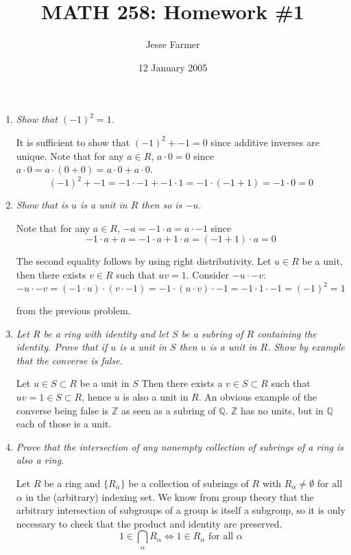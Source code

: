 \documentclass[letterpaper, 11pt]{article}
\title{MATH 258: Homework \#1}
\author{Jesse Farmer}
\date{12 January 2005}
\newcommand{\Z}{\mathbb{Z}}
\newcommand{\Q}{\mathbb{Q}}
\begin{document}
\maketitle
\begin{enumerate}

\item \emph{Show that $(-1)^2 = 1$.}

It is sufficient to show that $(-1)^2 + -1 = 0$ since additive inverses are unique.  Note that for any $a \in R$, $a \cdot 0 = 0$ since $a \cdot 0 = a \cdot (0+0) = a \cdot0 + a \cdot 0$.
\[
(-1)^2 + -1 = -1 \cdot -1 + -1 \cdot 1 = -1 \cdot (-1 + 1) = -1 \cdot 0 = 0
\]
\item \emph{Show that is $u$ is a unit in $R$ then so is $-u$.}

Note that for any $a \in R$, $-a = -1 \cdot a = a \cdot -1$ since
\[
-1 \cdot a + a = -1 \cdot a + 1 \cdot a = (-1 + 1)\cdot a = 0
\]

The second equality follows by using right distributivity.  Let $u \in R$ be a unit, then there exists $v \in R$ such that $uv = 1$.  Consider $-u \cdot -v$:
\[
-u \cdot -v = (-1 \cdot u) \cdot (v \cdot -1) = -1 \cdot (u \cdot v) \cdot -1 = -1 \cdot 1 \cdot -1 = (-1)^2 = 1
\]

from the previous problem.

\item \emph{Let $R$ be a ring with identity and let $S$ be a subring of $R$ containing the identity.  Prove that if $u$ is a unit in $S$ then $u$ is a unit in $R$.  Show by example that the converse is false.}

Let $u \in S \subset R$ be a unit in $S$  Then there exists a $v \in S \subset R$ such that $uv = 1 \in S \subset R$, hence $u$ is also a unit in $R$.  An obvious example of the converse being false is $\Z$ as seen as a subring of $\Q$.  $\Z$ has no units, but in $\Q$ each of those is a unit.

\item \emph{Prove that the intersection of any nonempty collection of subrings of a ring is also a ring.}

Let $R$ be a ring and $\{R_\alpha\}$ be a collection of subrings of $R$ with $R_\alpha \neq \emptyset$ for all $\alpha$ in the (arbitrary) indexing set.  We know from group theory that the arbitrary intersection of subgroups of a group is itself a subgroup, so it is only necessary to check that the product and identity are preserved.
\[
1 \in \bigcap_\alpha R_\alpha \Leftrightarrow 1 \in R_\alpha \mbox{ for all $\alpha$}
\]


\end{enumerate}
\end{document}
